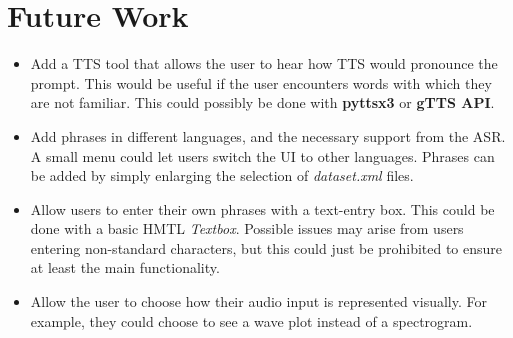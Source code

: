 \documentclass[12pt, letterpaper]{article}
\begin{document}
\section*{Future Work} \label{future}
\begin{itemize}
\item{Add a TTS tool that allows the user to hear how TTS would pronounce the prompt. This would be useful if the user encounters words with which they are not familiar. This could possibly be done with \textbf{pyttsx3} or \textbf{gTTS API}.}

\item{Add phrases in different languages, and the necessary support from the ASR. A small menu could let users switch the UI to other languages. Phrases can be added by simply enlarging the selection of \textit{dataset.xml} files.}

\item{Allow users to enter their own phrases with a text-entry box. This could be done with a basic HMTL \textit{Textbox}. Possible issues may arise from users entering non-standard characters, but this could just be prohibited to ensure at least the main functionality.}

\item{Allow the user to choose how their audio input is represented visually. For example, they could choose to see a wave plot instead of a spectrogram.}
\end{itemize}
\end{document}
